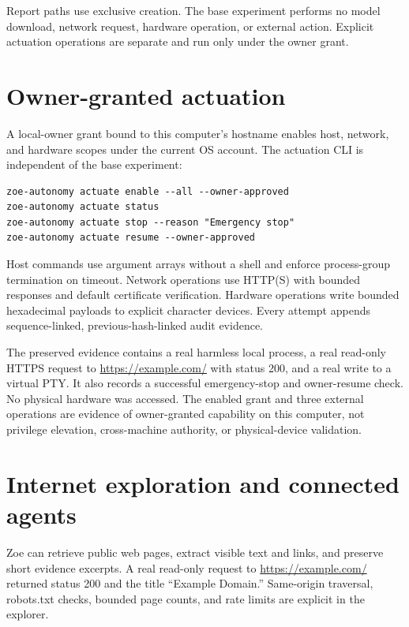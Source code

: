 \documentclass[11pt,a4paper]{article}
\begin{document}
Report paths use exclusive creation. The base experiment performs no model download, network request, hardware operation, or external action. Explicit actuation operations are separate and run only under the owner grant.

\section{Owner-granted actuation}
A local-owner grant bound to this computer's hostname enables host, network, and hardware scopes under the current OS account. The actuation CLI is independent of the base experiment:

\begin{lstlisting}
zoe-autonomy actuate enable --all --owner-approved
zoe-autonomy actuate status
zoe-autonomy actuate stop --reason "Emergency stop"
zoe-autonomy actuate resume --owner-approved
\end{lstlisting}

Host commands use argument arrays without a shell and enforce process-group termination on timeout. Network operations use HTTP(S) with bounded responses and default certificate verification. Hardware operations write bounded hexadecimal payloads to explicit character devices. Every attempt appends sequence-linked, previous-hash-linked audit evidence.

The preserved evidence contains a real harmless local process, a real read-only HTTPS request to \url{https://example.com/} with status 200, and a real write to a virtual PTY. It also records a successful emergency-stop and owner-resume check. No physical hardware was accessed. The enabled grant and three external operations are evidence of owner-granted capability on this computer, not privilege elevation, cross-machine authority, or physical-device validation.


\section{Internet exploration and connected agents}
Zoe can retrieve public web pages, extract visible text and links, and preserve short evidence excerpts. A real read-only request to \url{https://example.com/} returned status 200 and the title ``Example Domain.'' Same-origin traversal, robots.txt checks, bounded page counts, and rate limits are explicit in the explorer.
\end{document}
